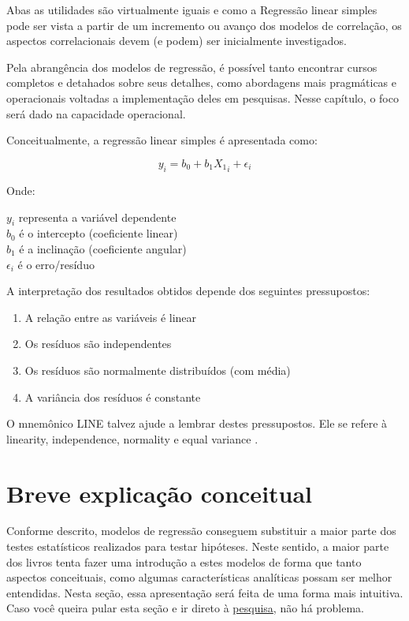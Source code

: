 \documentclass[
]{book}
\providecommand{\tightlist}{%
  \setlength{\itemsep}{0pt}\setlength{\parskip}{0pt}}
\begin{document}
Abas as utilidades são virtualmente iguais e como a Regressão linear
simples pode ser vista a partir de um incremento ou avanço dos modelos
de correlação, os aspectos correlacionais devem (e podem) ser
inicialmente investigados.

Pela abrangência dos modelos de regressão, é possível tanto encontrar
cursos completos e detahados sobre seus detalhes, como abordagens mais
pragmáticas e operacionais voltadas a implementação deles em pesquisas.
Nesse capítulo, o foco será dado na capacidade operacional.

Conceitualmente, a regressão linear simples é apresentada como:

\[y_i = b_0 + b_1X{_1}_i + \epsilon_{i}\]

Onde:

\(y_i\) representa a variável dependente\\
\(b_0\) é o intercepto (coeficiente linear)\\
\(b_1\) é a inclinação (coeficiente angular)\\
\(\epsilon_{i}\) é o erro/resíduo

A interpretação dos resultados obtidos depende dos seguintes
pressupostos:

\begin{enumerate}
\def\labelenumi{(\roman{enumi})}
\tightlist
\item
  A relação entre as variáveis é linear
\item
  Os resíduos são independentes\\
\item
  Os resíduos são normalmente distribuídos (com média)\\
\item
  A variância dos resíduos é constante
\end{enumerate}

O mnemônico LINE talvez ajude a lembrar destes pressupostos. Ele se
refere à linearity, independence, normality e equal variance .

\hypertarget{breve-explicauxe7uxe3o-conceitual}{%
\section{Breve explicação
conceitual}\label{breve-explicauxe7uxe3o-conceitual}}

Conforme descrito, modelos de regressão conseguem substituir a maior
parte dos testes estatísticos realizados para testar hipóteses. Neste
sentido, a maior parte dos livros tenta fazer uma introdução a estes
modelos de forma que tanto aspectos conceituais, como algumas
características analíticas possam ser melhor entendidas. Nesta seção,
essa apresentação será feita de uma forma mais intuitiva. Caso você
queira pular esta seção e ir direto à
\protect\hyperlink{ux5cux23pesquisa}{pesquisa}, não há problema.
\end{document}
